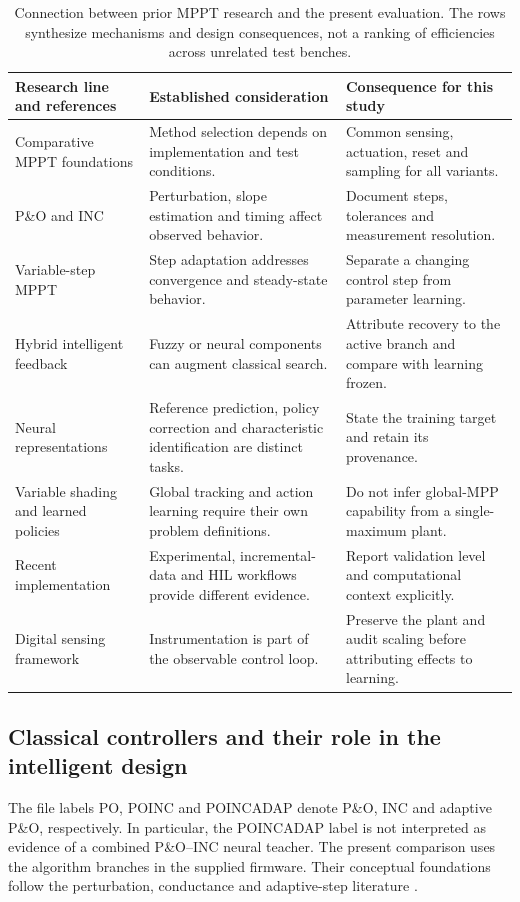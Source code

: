 \begin{table}[htbp]
\caption{Connection between prior MPPT research and the present evaluation. The rows synthesize mechanisms and design consequences, not a ranking of efficiencies across unrelated test benches.}
\label{tab:literature}
\centering\small
\begin{tabularx}{\textwidth}{p{}LL}\toprule
Research line and references & Established consideration & Consequence for this study\\\midrule
Comparative MPPT foundations \cite{esram,subudhi,hohm} & Method selection depends on implementation and test conditions. & Common sensing, actuation, reset and sampling for all variants.\\
P\&O and INC \cite{femia,hussein,sera} & Perturbation, slope estimation and timing affect observed behavior. & Document steps, tolerances and measurement resolution.\\
Variable-step MPPT \cite{liu,adaptive,adaptive2015} & Step adaptation addresses convergence and steady-state behavior. & Separate a changing control step from parameter learning.\\
Hybrid intelligent feedback \cite{zainuri,hybrid2024} & Fuzzy or neural components can augment classical search. & Attribute recovery to the active branch and compare with learning frozen.\\
Neural representations \cite{hiyama,elobaid,nnmodel} & Reference prediction, policy correction and characteristic identification are distinct tasks. & State the training target and retain its provenance.\\
Variable shading and learned policies \cite{rizzo,giraldo} & Global tracking and action learning require their own problem definitions. & Do not infer global-MPP capability from a single-maximum plant.\\
Recent implementation \cite{abouzeid,amine,jamshed} & Experimental, incremental-data and HIL workflows provide different evidence. & Report validation level and computational context explicitly.\\
Digital sensing framework \cite{suarez} & Instrumentation is part of the observable control loop. & Preserve the plant and audit scaling before attributing effects to learning.\\\bottomrule
\end{tabularx}
\end{table}


\subsection{Classical controllers and their role in the intelligent design}
The file labels PO, POINC and POINCADAP denote P\&O, INC and adaptive P\&O, respectively. In particular, the POINCADAP label is not interpreted as evidence of a combined P\&O--INC neural teacher. The present comparison uses the algorithm branches in the supplied firmware. Their conceptual foundations follow the perturbation, conductance and adaptive-step literature \cite{femia,hussein,liu,adaptive}.

